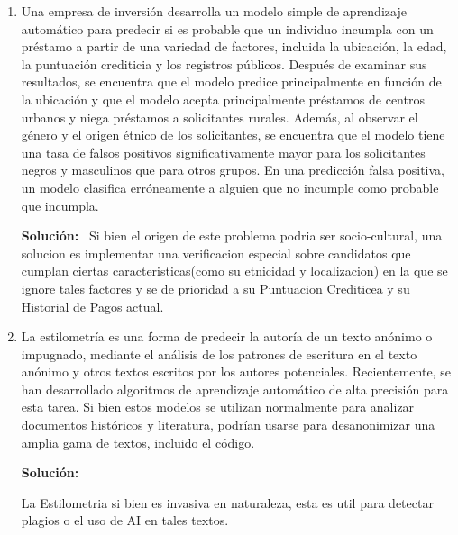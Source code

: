 \documentclass[11pt,letterpaper]{article}
\newenvironment{solution}{%
  \noindent\begin{shaded}
  \textbf{Solución:}\ }{
  \end{shaded}%
}
\begin{document}
\begin{enumerate}
\item%
  Una empresa de inversión desarrolla un modelo simple de aprendizaje
  automático para predecir si es probable que un individuo incumpla
  con un préstamo a partir de una variedad de factores, incluida la
  ubicación, la edad, la puntuación crediticia y los registros
  públicos.  Después de examinar sus resultados, se encuentra que el
  modelo predice principalmente en función de la ubicación y que el
  modelo acepta principalmente préstamos de centros urbanos y niega
  préstamos a solicitantes rurales.  Además, al observar el género y
  el origen étnico de los solicitantes, se encuentra que el modelo
  tiene una tasa de falsos positivos significativamente mayor para los
  solicitantes negros y masculinos que para otros grupos.  En una
  predicción falsa positiva, un modelo clasifica erróneamente a
  alguien que no incumple como probable que incumpla.
  \begin{solution}
    Si bien el origen de este problema podria ser socio-cultural, una solucion es implementar una verificacion especial sobre candidatos que cumplan ciertas caracteristicas(como su etnicidad y localizacion) en la que se ignore tales factores y se de prioridad a su Puntuacion Crediticea y su Historial de Pagos actual.
  \end{solution}
\newpage
\item%
  La estilometría es una forma de predecir la autoría de un texto
  anónimo o impugnado, mediante el análisis de los patrones de
  escritura en el texto anónimo y otros textos escritos por los
  autores potenciales.  Recientemente, se han desarrollado algoritmos
  de aprendizaje automático de alta precisión para esta tarea.  Si
  bien estos modelos se utilizan normalmente para analizar documentos
  históricos y literatura, podrían usarse para desanonimizar una
  amplia gama de textos, incluido el código.
  \begin{solution}
  \end{solution}

  La Estilometria si bien es invasiva en naturaleza, esta es util para detectar plagios o el uso de AI en tales textos.


\end{enumerate}
\end{document}

